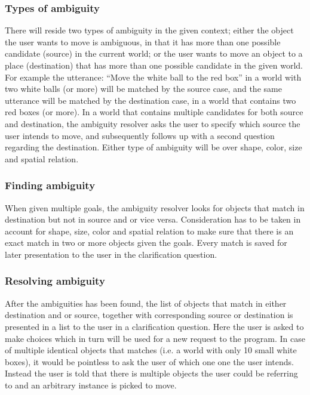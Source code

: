 \documentclass[11pt]{article}
\begin{document}
\subsubsection*{Types of ambiguity}
There will reside two types of ambiguity in the given context; either the object the user wants to move is ambiguous, in that it has more than one possible candidate (source) in the current world; or the user wants to move an object to a place (destination) that has more than one possible candidate in the given world. For example the utterance:
“Move the white ball to the red box”
in a world with two white balls (or more) will be matched by the source case, and the same utterance will be matched by the destination case, in a world that contains two red boxes (or more).
In a world that contains multiple candidates for both source and destination, the ambiguity resolver asks the user to specify which source the user intends to move, and subsequently follows up with a second question regarding the destination.
Either type of ambiguity will be over shape, color, size and spatial relation.

\subsubsection*{Finding ambiguity}
When given multiple goals, the ambiguity resolver looks for objects that match in destination but not in source and or vice versa. Consideration has to be taken in account for shape, size, color and spatial relation to make sure that there is an exact match in two or more objects given the goals. Every match is saved for later presentation to the user in the clarification question.

\subsubsection*{Resolving ambiguity}
After the ambiguities has been found, the list of  objects that match in either destination and or source, together with corresponding source or destination is presented in a list to the user in a clarification question. Here the user is asked to make choices which in turn will be used for a new request to the program.
In case of multiple identical objects that matches (i.e. a world with only 10 small white boxes), it would be pointless to ask the user of which one one the user intends. Instead the user is told that there is multiple objects the user could be referring to and an arbitrary instance is picked to move.
\end{document}
